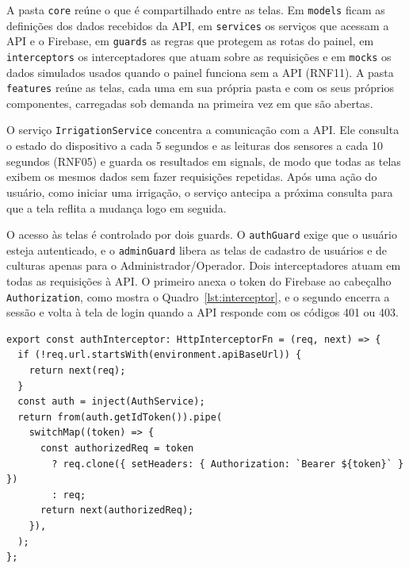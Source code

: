 A pasta \texttt{core} reúne o que é compartilhado entre as telas. Em \texttt{models} ficam as definições dos dados recebidos da API, em \texttt{services} os serviços que acessam a API e o Firebase, em \texttt{guards} as regras que protegem as rotas do painel, em \texttt{interceptors} os interceptadores que atuam sobre as requisições e em \texttt{mocks} os dados simulados usados quando o painel funciona sem a API (RNF11). A pasta \texttt{features} reúne as telas, cada uma em sua própria pasta e com os seus próprios componentes, carregadas sob demanda na primeira vez em que são abertas.

O serviço \texttt{IrrigationService} concentra a comunicação com a API. Ele consulta o estado do dispositivo a cada 5 segundos e as leituras dos sensores a cada 10 segundos (RNF05) e guarda os resultados em signals, de modo que todas as telas exibem os mesmos dados sem fazer requisições repetidas. Após uma ação do usuário, como iniciar uma irrigação, o serviço antecipa a próxima consulta para que a tela reflita a mudança logo em seguida.

O acesso às telas é controlado por dois guards. O \texttt{authGuard} exige que o usuário esteja autenticado, e o \texttt{adminGuard} libera as telas de cadastro de usuários e de culturas apenas para o Administrador/Operador. Dois interceptadores atuam em todas as requisições à API. O primeiro anexa o token do Firebase ao cabeçalho \texttt{Authorization}, como mostra o Quadro~\ref{lst:interceptor}, e o segundo encerra a sessão e volta à tela de login quando a API responde com os códigos 401 ou 403.

\vspace{0.6\baselineskip}
\noindent\begin{minipage}{\linewidth}
\begin{lstlisting}[language={}, caption={Inclusão do token nas requisições à API (auth.interceptor.ts)}, label={lst:interceptor}]
export const authInterceptor: HttpInterceptorFn = (req, next) => {
  if (!req.url.startsWith(environment.apiBaseUrl)) {
    return next(req);
  }
  const auth = inject(AuthService);
  return from(auth.getIdToken()).pipe(
    switchMap((token) => {
      const authorizedReq = token
        ? req.clone({ setHeaders: { Authorization: `Bearer ${token}` } })
        : req;
      return next(authorizedReq);
    }),
  );
};
\end{lstlisting}
\vspace{-0.5\baselineskip}
\end{minipage}
\medskip

